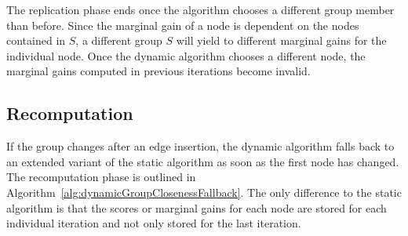 The replication phase ends once the algorithm chooses a different group member than before. Since the marginal gain of a node is dependent on the nodes contained in $S$, a different group $S$ will yield to different marginal gains for the individual node. Once the dynamic algorithm chooses a different node, the marginal gains computed in previous iterations become invalid.

\subsection{Recomputation}
If the group changes after an edge insertion, the dynamic algorithm falls back to an extended variant of the static algorithm as soon as the first node has changed. The recomputation phase is outlined in Algorithm~\ref{alg:dynamicGroupClosenessFallback}. The only difference to the static algorithm is that the scores or marginal gains for each node are stored for each individual iteration and not only stored for the last iteration.

